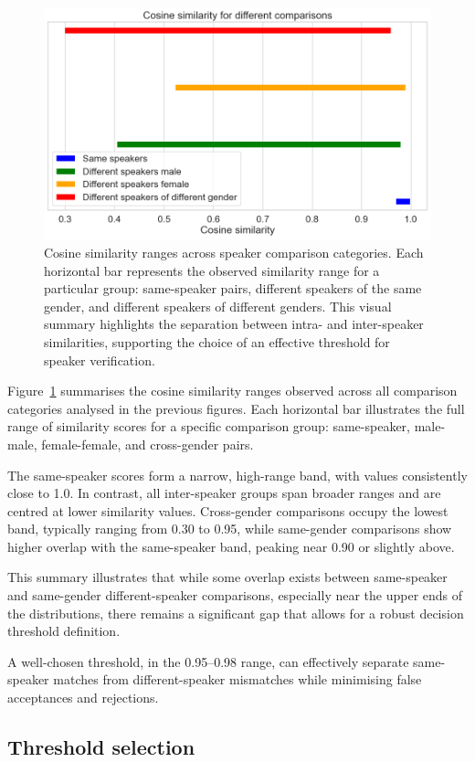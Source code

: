 \documentclass[conference]{IEEEtran}
\begin{document}
\begin{figure}[H]
	\centering
	\includegraphics[width=0.7\linewidth]{img/img-similarity-comparison}
	\caption{Cosine similarity ranges across speaker comparison categories. Each horizontal bar represents the observed similarity range for a particular group: same-speaker pairs, different speakers of the same gender, and different speakers of different genders. This visual summary highlights the separation between intra- and inter-speaker similarities, supporting the choice of an effective threshold for speaker verification.}
	\label{fig:img-similarity-comparison}
\end{figure}

Figure~\ref{fig:img-similarity-comparison} summarises the cosine similarity ranges observed across all comparison categories analysed in the previous figures. Each horizontal bar illustrates the full range of similarity scores for a specific comparison group: same-speaker, male-male, female-female, and cross-gender pairs.

The same-speaker scores form a narrow, high-range band, with values consistently close to 1.0. In contrast, all inter-speaker groups span broader ranges and are centred at lower similarity values. Cross-gender comparisons occupy the lowest band, typically ranging from 0.30 to 0.95, while same-gender comparisons show higher overlap with the same-speaker band, peaking near 0.90 or slightly above.

This summary illustrates that while some overlap exists between same-speaker and same-gender different-speaker comparisons, especially near the upper ends of the distributions, there remains a significant gap that allows for a robust decision threshold definition.

A well-chosen threshold, in the 0.95–0.98 range, can effectively separate same-speaker matches from different-speaker mismatches while minimising false acceptances and rejections.

\subsection{Threshold selection}
\end{document}
